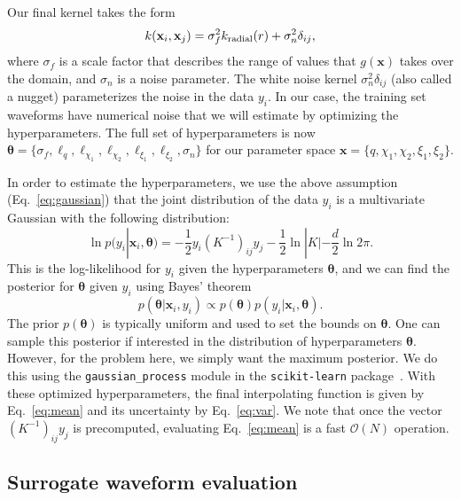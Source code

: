 \documentclass[prd,aps,letter,twocolumn,floatfix,notitlepage,nofootinbib]{revtex4-1}
\def\bx{\mathbf{x}}
\def\btheta{\boldsymbol{\theta}}
\begin{document}
Our final kernel takes the form
\begin{equation}
k(\bx_i, \bx_j) = \sigma_f^2 k_{\rm radial}(r) + \sigma_n^2 \delta_{ij},
\end{equation}
where $\sigma_f$ is a scale factor that describes the range of values that $g(\bx)$ takes over the domain, and $\sigma_n$ is a noise parameter. The white noise kernel $\sigma_n^2 \delta_{ij}$ (also called a nugget) parameterizes the noise in the data $y_i$. In our case, the training set waveforms have numerical noise that we will estimate by optimizing the hyperparameters. The full set of hyperparameters is now  $\btheta = \{\sigma_f, \ell_q, \ell_{\chi_1}, \ell_{\chi_2}, \ell_{\xi_1}, \ell_{\xi_2}, \sigma_n\}$ for our parameter space $\bx = \{q, \chi_1, \chi_2, \xi_1, \xi_2\}$.

In order to estimate the hyperparameters, we use the above assumption (Eq.~\eqref{eq:gaussian}) that the joint distribution of 
the data $y_i$ is a multivariate Gaussian with the following distribution:
\begin{equation}
\ln p(y_i | \bx_i, {\bm \theta}) = -\frac{1}{2} y_i (K^{-1})_{ij} y_j - \frac{1}{2} \ln |K| - \frac{d}{2} \ln 2\pi.
\end{equation}
This is the log-likelihood for $y_i$ given the hyperparameters ${\bm \theta}$, and we can find the posterior for ${\bm \theta}$
given $y_i$ using Bayes' theorem
\begin{equation}
p({\bm \theta} | \bx_i, y_i) \propto p({\bm \theta}) p(y_i | \bx_i, {\bm \theta}).
\end{equation}
The prior $p({\bm \theta})$ is typically uniform and used to set the bounds on ${\bm \theta}$. One can sample this posterior if interested in the distribution of hyperparameters $\btheta$. However, for the problem here, we simply want the maximum posterior. We do this using the \texttt{gaussian\_process} module in the \texttt{scikit-learn} package~\cite{scikit-learn}. With these optimized hyperparameters, the final interpolating function is given by Eq.~\eqref{eq:mean} and its uncertainty by Eq.~\eqref{eq:var}. We note that once the vector $(K^{-1})_{ij}y_j$ is precomputed, evaluating Eq.~\eqref{eq:mean} is a fast $\mathcal{O}(N)$ operation.


\subsection{Surrogate waveform evaluation}
\end{document}
